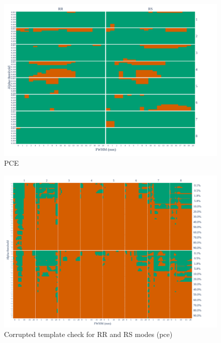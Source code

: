 \documentclass{article}
\begin{document}
\begin{appendices}
    \begin{figure}
        \centering
        \includegraphics[width=\linewidth]{figures/exclude_pce.pdf}
        \caption{PCE}
        \label{fig:loo_pce}
    \end{figure}

    \begin{figure}
        \centering
        \includegraphics[width=\linewidth]{figures/template/template_pce.pdf}
        \caption{Corrupted template check for RR and RS modes (pce)}
    \end{figure}


\end{appendices}
\end{document}
